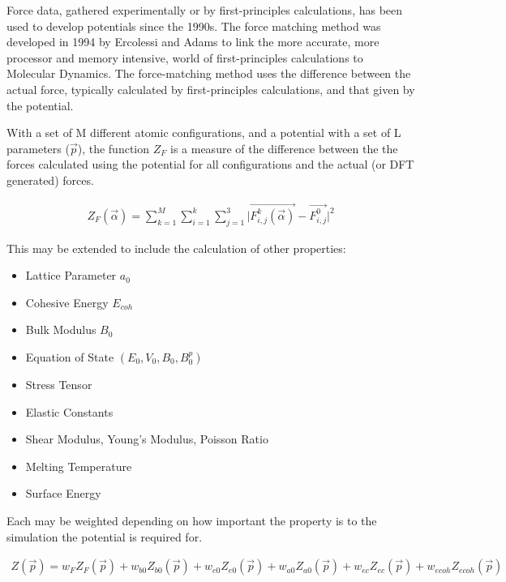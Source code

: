 Force data, gathered experimentally or by first-principles calculations, has been used to develop potentials since the 1990s.  The force matching method was developed in 1994 by Ercolessi and Adams \cite{forcematchingmethod} to link the more accurate, more processor and memory intensive, world of first-principles calculations to Molecular Dynamics.  The force-matching method uses the difference between the actual force, typically calculated by first-principles calculations, and that given by the potential.

With a set of M different atomic configurations, and a potential with a set of L parameters ($ \vec{p} $), the function $Z_F$ is a measure of the difference between the the forces calculated using the potential for all configurations and the actual (or DFT generated) forces.

\begin{equation}
\begin{split}
Z_F(\vec{\alpha}) = \sum _{k=1}^M \sum _{i=1} ^{k} \sum _{j=1} ^{3} \lvert \vec{F^k_{i,j} (\vec{\alpha})} - \vec{F^0_{i,j}} \rvert^2
\end{split}
\label{eq:eqForceMatchingB}
\end{equation}

This may be extended to include the calculation of other properties:

\begin{itemize}
\item Lattice Parameter $a_0$
\item Cohesive Energy $E_{coh}$
\item Bulk Modulus $B_{0}$
\item Equation of State $(E_{0}, V_{0}, B_0, {B^{p}_0})$
\item Stress Tensor
\item Elastic Constants
\item Shear Modulus, Young's Modulus, Poisson Ratio
\item Melting Temperature
\item Surface Energy
\end{itemize}

Each may be weighted depending on how important the property is to the simulation the potential is required for.

\begin{equation}
\begin{split}
Z(\vec{p}) = w_{F} Z_F(\vec{p}) + w_{b0} Z_{b0}(\vec{p}) + w_{e0} Z_{e0}(\vec{p}) + w_{a0} Z_{a0}(\vec{p}) + w_{ec} Z_{ec}(\vec{p}) + w_{ecoh} Z_{ecoh}(\vec{p})
\end{split}
\label{eq:eqForceMatchingA}
\end{equation}

